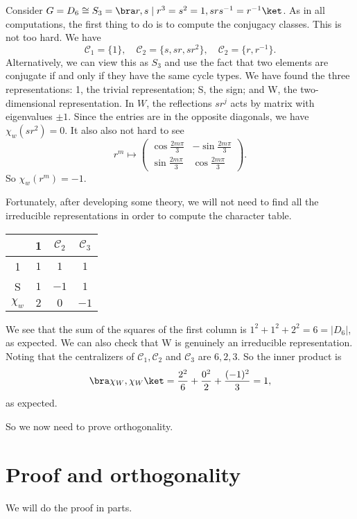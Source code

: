 \documentclass[a4paper]{article}
\begin{document}
\begin{eg}
  Consider $G = D_6 \cong S_3 = \bra r, s\mid r^3 = s^2 = 1, srs^{-1} = r^{-1}\ket$. As in all computations, the first thing to do is to compute the conjugacy classes. This is not too hard. We have
  \[
    \mathcal{C}_1 = \{1\},\quad \mathcal{C}_2 = \{s, sr, sr^2\},\quad \mathcal{C}_2 = \{r, r^{-1}\}.
  \]
  Alternatively, we can view this as $S_3$ and use the fact that two elements are conjugate if and only if they have the same cycle types. We have found the three representations: 1, the trivial representation; S, the sign; and W, the two-dimensional representation. In $W$, the reflections $sr^j$ acts by matrix with eigenvalues $\pm 1$. Since the entries are in the opposite diagonals, we have $\chi_w(sr^2)= 0$. It also also not hard to see
  \[
    r^m \mapsto
    \begin{pmatrix}
      \cos \frac{2m \pi}{3} & - \sin \frac{2m\pi}{3}\\
      \sin \frac{2m\pi}{3} & \cos \frac{2m \pi}{3}
    \end{pmatrix}.
  \]
  So $\chi_w(r^m) = -1$.

  Fortunately, after developing some theory, we will not need to find all the irreducible representations in order to compute the character table.
  \begin{center}
    \begin{tabular}{cccc}
      \toprule
      & 1 & $\mathcal{C}_2$ & $\mathcal{C}_3$\\
      \midrule
      1 & $1$ & $1$ & $1$\\
      S & $1$ & $-1$ & $1$\\
      $\chi_w$ & $2$ & $0$ & $-1$\\
      \bottomrule
    \end{tabular}
  \end{center}
  We see that the sum of the squares of the first column is $1^2 + 1^2 + 2^2 = 6 = |D_6|$, as expected. We can also check that W is genuinely an irreducible representation. Noting that the centralizers of $\mathcal{C}_1, \mathcal{C}_2$ and $\mathcal{C}_3$ are $6, 2, 3$. So the inner product is
  \[
    \bra \chi_W, \chi_W\ket = \frac{2^2}{6} + \frac{0^2}{2} + \frac{(-1)^2}{3} = 1,
  \]
  as expected.
\end{eg}
So we now need to prove orthogonality.
\section{Proof and orthogonality}
We will do the proof in parts.
\end{document}
